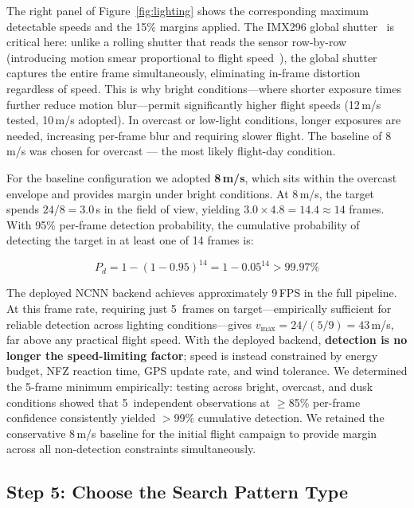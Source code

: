 \documentclass[10pt,a4paper]{article}
\begin{document}
The right panel of Figure~\ref{fig:lighting} shows the corresponding maximum detectable speeds and the 15\% margins applied. The IMX296 global shutter~\citep{imx296} is critical here: unlike a rolling shutter that reads the sensor row-by-row (introducing motion smear proportional to flight speed~\citep{sukhatme2012rolling_global}), the global shutter captures the entire frame simultaneously, eliminating in-frame distortion regardless of speed. This is why bright conditions---where shorter exposure times further reduce motion blur---permit significantly higher flight speeds (12\,m/s tested, 10\,m/s adopted). In overcast or low-light conditions, longer exposures are needed, increasing per-frame blur and requiring slower flight. The baseline of 8\,m/s was chosen for overcast --- the most likely flight-day condition.

For the baseline configuration we adopted \textbf{8\,m/s}, which sits within the overcast envelope and provides margin under bright conditions. At 8\,m/s, the target spends $24 / 8 = 3.0$\,s in the field of view, yielding $3.0 \times 4.8 = 14.4 \approx 14$ frames. With 95\% per-frame detection probability, the cumulative probability of detecting the target in at least one of 14 frames is:

\[
P_d = 1 - (1 - 0.95)^{14} = 1 - 0.05^{14} > 99.97\%
\]

The deployed NCNN backend achieves approximately 9\,FPS in the full pipeline. At this frame rate, requiring just 5~frames on target---empirically sufficient for reliable detection across lighting conditions---gives $v_{\text{max}} = 24 / (5/9) = 43$\,m/s, far above any practical flight speed. With the deployed backend, \textbf{detection is no longer the speed-limiting factor}; speed is instead constrained by energy budget, NFZ reaction time, GPS update rate, and wind tolerance. We determined the 5-frame minimum empirically: testing across bright, overcast, and dusk conditions showed that 5~independent observations at $\geq$85\% per-frame confidence consistently yielded $>$99\% cumulative detection. We retained the conservative 8\,m/s baseline for the initial flight campaign to provide margin across all non-detection constraints simultaneously.


\subsection{Step 5: Choose the Search Pattern Type}\label{sec:step5}
\end{document}
